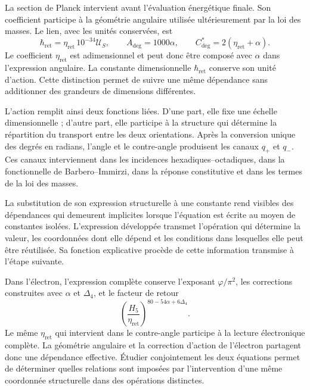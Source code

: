 La section de Planck intervient avant l’évaluation énergétique finale.
Son coefficient participe à la géométrie angulaire utilisée ultérieurement
par la loi des masses. Le lien, avec les unités conservées, est
\begin{equation}
 \hbar_{\mathrm{ret}}
   =\eta_{\mathrm{ret}}\,10^{-34}\mathcal U_S,
 \qquad
 A_{\deg}=1000\alpha,
 \qquad
 C^*_{\deg}=2(\eta_{\mathrm{ret}}+\alpha).
 \label{eq:narrativa-par-angular}
\end{equation}
Le coefficient $\eta_{\mathrm{ret}}$ est adimensionnel et peut donc
être composé avec $\alpha$ dans l’expression angulaire. La constante dimensionnelle
$\hbar_{\mathrm{ret}}$ conserve son unité d’action. Cette distinction permet de
suivre une même dépendance sans additionner des grandeurs de dimensions différentes.

L’action remplit ainsi deux fonctions liées. D’une part, elle fixe une
échelle dimensionnelle ; d’autre part, elle participe à la structure qui détermine la
répartition du transport entre les deux orientations. Après la conversion
unique des degrés en radians, l’angle et le contre-angle produisent les canaux
$q_+$ et $q_-$. Ces canaux interviennent dans les incidences hexadiques--octadiques,
dans la fonctionnelle de Barbero--Immirzi, dans la réponse constitutive et dans les
termes de la loi des masses.

La substitution de son expression structurelle à une constante rend visibles
des dépendances qui demeurent implicites lorsque l’équation est écrite au moyen
de constantes isolées. L’expression développée transmet l’opération qui
détermine la valeur, les coordonnées dont elle dépend et les conditions
dans lesquelles elle peut être réutilisée. Sa fonction explicative procède de cette
information transmise à l’étape suivante.

Dans l’électron, l’expression complète conserve l’exposant
$\varphi/\pi^2$, les corrections construites avec $\alpha$ et $\Delta_4$,
et le facteur de retour
\begin{equation}
 \left(\frac{H_5}{\eta_{\mathrm{ret}}}\right)^{80-54\alpha+6\Delta_4}.
 \label{eq:narrativa-factor-electronico}
\end{equation}
Le même $\eta_{\mathrm{ret}}$ qui intervient dans le contre-angle participe
à la lecture électronique complète. La géométrie angulaire et la correction
d’action de l’électron partagent donc une dépendance effective.
Étudier conjointement les deux équations permet de déterminer quelles relations
sont imposées par l’intervention d’une même coordonnée structurelle
dans des opérations distinctes.

